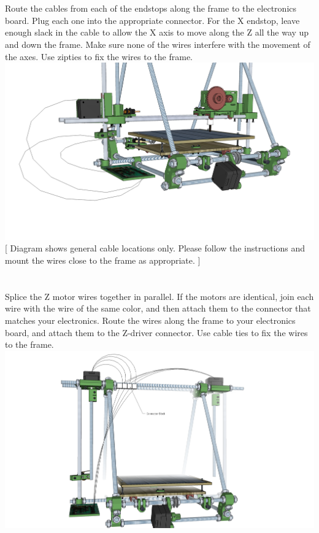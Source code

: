 \documentclass[twoside,a4paper,titlepage]{memoir}
\begin{document}
	\section{}
	Route the cables from each of the endstops along the frame to the electronics board. Plug each one
	into the appropriate connector. For the X endstop, leave enough slack in the cable to allow the X axis to
	move along the Z all the way up and down the frame. Make sure none of the wires interfere with the
	movement of the axes. Use zipties to fix the wires to the frame.\\
	\includegraphics[width=1\linewidth]{graphics/ch10_12.png}
	[ Diagram shows general cable locations only. Please follow the instructions and mount the wires
	close to the frame as appropriate. ]
	
	\section{}
	Splice the Z motor wires together in parallel. If the motors are identical, join each wire with the wire of
	the same color, and then attach them to the connector that matches your electronics. Route the wires
	along the frame to your electronics board, and attach them to the Z-driver connector. Use cable ties to
	fix the wires to the frame.\\
	\includegraphics[width=1\linewidth]{graphics/ch10_13.png}
	
\end{document}
